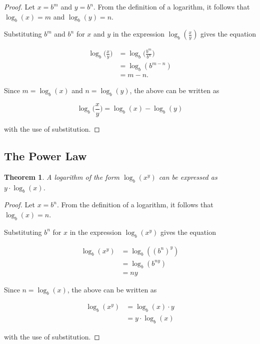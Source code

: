 \documentclass[parskip]{scrartcl}
\newtheorem*{theorem}{Theorem}
\begin{document}
\begin{proof}
  Let \(x = b^{m}\) and \(y = b^{n}\). From the definition of a logarithm, it
  follows that \(\log_{b}(x) = m\) and \(\log_{b}(y) = n\).

  Substituting \(b^{m}\) and \(b^{n}\) for \(x\) and \(y\) in the expression
  \(\log_{b}(\frac{x}{y})\) gives the equation

  \begin{equation*}
    \begin{split}
      \log_{b}\big(\frac{x}{y}\big) &= \log_{b}\big(\frac{b^{m}}{b^{n}}\big) \\
      &= \log_{b}(b^{m - n}) \\
      &= m - n.
    \end{split}
  \end{equation*}

  Since \(m = \log_{b}(x)\) and \(n = \log_{b}(y)\), the above can be written as

  \begin{equation*}
    \log_{b}\big(\frac{x}{y}\big) = \log_{b}(x) - \log_{b}(y)
  \end{equation*}

  with the use of substitution.
\end{proof}

\subsection{The Power Law}

\begin{theorem}
  A logarithm of the form \(\log_{b}(x^{y})\) can be expressed as \(y ·
  \log_{b}(x)\).
\end{theorem}

\begin{proof}
  Let \(x = b^{n}\). From the definition of a logarithm, it follows that
  \(\log_{b}(x) = n\).

  Substituting \(b^{n}\) for \(x\) in the expression \(\log_{b}(x^{y})\) gives
  the equation

  \begin{equation*}
    \begin{split}
      \log_{b}(x^{y}) &= \log_{b}({(b^{n})}^{y}) \\
      &= \log_{b}(b^{ny}) \\
      &= ny
    \end{split}
  \end{equation*}

  Since \(n = \log_{b}(x)\), the above can be written as

  \begin{equation*}
    \begin{split}
      \log_{b}(x^{y}) &= \log_{b}(x) · y \\
      &= y · \log_{b}(x)
    \end{split}
  \end{equation*}

  with the use of substitution.
\end{proof}
\end{document}
